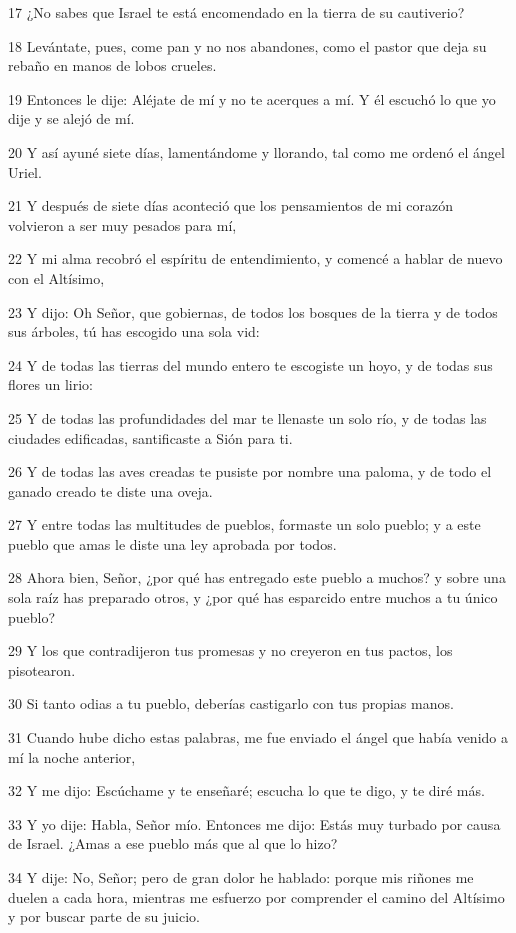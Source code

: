 \par 17 ¿No sabes que Israel te está encomendado en la tierra de su cautiverio?
\par 18 Levántate, pues, come pan y no nos abandones, como el pastor que deja su rebaño en manos de lobos crueles.
\par 19 Entonces le dije: Aléjate de mí y no te acerques a mí. Y él escuchó lo que yo dije y se alejó de mí.
\par 20 Y así ayuné siete días, lamentándome y llorando, tal como me ordenó el ángel Uriel.
\par 21 Y después de siete días aconteció que los pensamientos de mi corazón volvieron a ser muy pesados ​​para mí,
\par 22 Y mi alma recobró el espíritu de entendimiento, y comencé a hablar de nuevo con el Altísimo,
\par 23 Y dijo: Oh Señor, que gobiernas, de todos los bosques de la tierra y de todos sus árboles, tú has escogido una sola vid:
\par 24 Y de todas las tierras del mundo entero te escogiste un hoyo, y de todas sus flores un lirio:
\par 25 Y de todas las profundidades del mar te llenaste un solo río, y de todas las ciudades edificadas, santificaste a Sión para ti.
\par 26 Y de todas las aves creadas te pusiste por nombre una paloma, y ​​de todo el ganado creado te diste una oveja.
\par 27 Y entre todas las multitudes de pueblos, formaste un solo pueblo; y a este pueblo que amas le diste una ley aprobada por todos.
\par 28 Ahora bien, Señor, ¿por qué has entregado este pueblo a muchos? y sobre una sola raíz has preparado otros, y ¿por qué has esparcido entre muchos a tu único pueblo?
\par 29 Y los que contradijeron tus promesas y no creyeron en tus pactos, los pisotearon.
\par 30 Si tanto odias a tu pueblo, deberías castigarlo con tus propias manos.
\par 31 Cuando hube dicho estas palabras, me fue enviado el ángel que había venido a mí la noche anterior,
\par 32 Y me dijo: Escúchame y te enseñaré; escucha lo que te digo, y te diré más.
\par 33 Y yo dije: Habla, Señor mío. Entonces me dijo: Estás muy turbado por causa de Israel. ¿Amas a ese pueblo más que al que lo hizo?
\par 34 Y dije: No, Señor; pero de gran dolor he hablado: porque mis riñones me duelen a cada hora, mientras me esfuerzo por comprender el camino del Altísimo y por buscar parte de su juicio.
